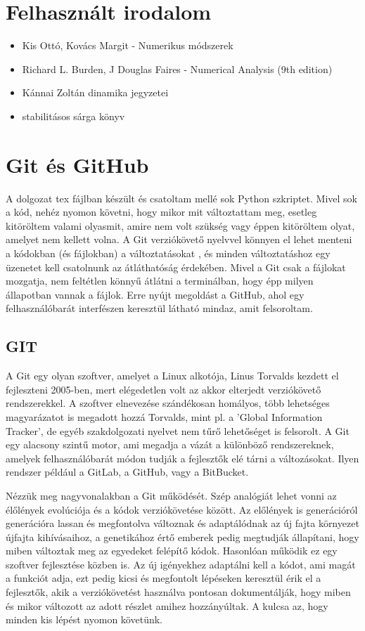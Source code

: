 \documentclass{article}
\theoremstyle{definition}
\theoremstyle{theorem}
\begin{document}
\section{Felhasznált irodalom}
\begin{itemize}
    \item Kis Ottó, Kovács Margit - Numerikus módszerek
    \item Richard L. Burden, J Douglas Faires - Numerical Analysis (9th edition)
    \item Kánnai Zoltán dinamika jegyzetei
    \item stabilitásos sárga könyv
\end{itemize}

\section{Git és GitHub}
A dolgozat tex fájlban készült és csatoltam mellé sok Python szkriptet. Mivel sok a kód, nehéz nyomon követni, hogy mikor mit változtattam meg, esetleg kitöröltem valami olyasmit, amire nem volt szükség vagy éppen kitöröltem olyat, amelyet nem kellett volna. A Git verziókövető nyelvvel könnyen el lehet menteni a kódokban (és fájlokban) a változtatásokat , és minden változtatáshoz egy üzenetet kell csatolnunk az átláthatóság érdekében. Mivel a Git csak a fájlokat mozgatja, nem feltétlen könnyű átlátni a terminálban, hogy épp milyen állapotban vannak a fájlok. Erre nyújt megoldást a GitHub, ahol egy felhasználóbarát interfészen keresztül látható mindaz, amit felsoroltam.
\subsection{GIT}
A Git egy olyan szoftver, amelyet a Linux alkotója, Linus Torvalds kezdett el fejleszteni 2005-ben, mert elégedetlen volt az akkor elterjedt verziókövető rendszerekkel. A szoftver elnevezése szándékosan homályos, több lehetséges magyarázatot is megadott hozzá Torvalds, mint pl. a 'Global Information Tracker', de egyéb szakdolgozati nyelvet nem tűrő lehetőséget is felsorolt. A Git egy alacsony szintű motor, ami megadja a vázát a különböző rendszereknek, amelyek felhasználóbarát módon tudják a fejlesztők elé tárni a változásokat. Ilyen rendszer például a GitLab, a GitHub, vagy a BitBucket.

Nézzük meg nagyvonalakban a Git működését. Szép analógiát lehet vonni az élőlények evolúciója és a kódok verziókövetése között. Az előlények is generációról generációra lassan és megfontolva változnak és adaptálódnak az új fajta környezet újfajta kihívásaihoz, a genetikához értő emberek pedig megtudják állapítani, hogy miben változtak meg az egyedeket felépítő kódok. Hasonlóan működik ez egy szoftver fejlesztése közben is. Az új igényekhez adaptálni kell a kódot, ami magát a funkciót adja, ezt pedig kicsi és megfontolt lépéseken keresztül érik el a fejlesztők, akik a verziókövetést használva pontosan dokumentálják, hogy miben és mikor változott az adott részlet amihez hozzányúltak. A kulcsa az, hogy minden kis lépést nyomon követünk.
\end{document}
